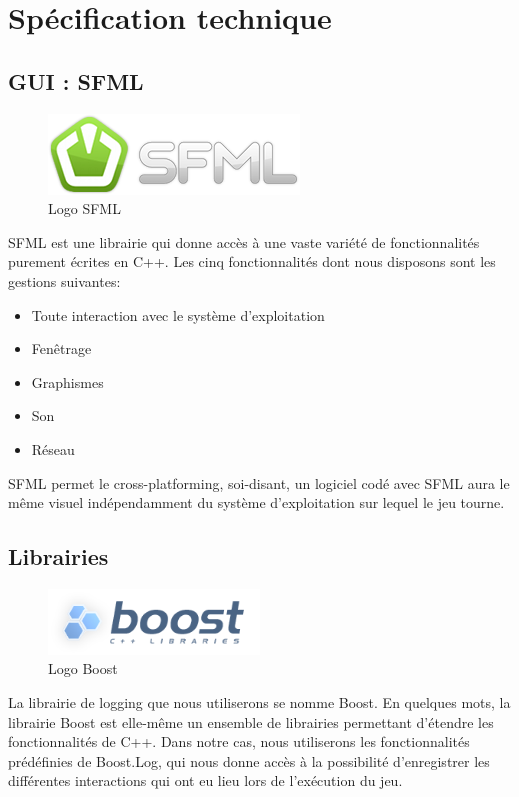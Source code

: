 \section{Spécification technique}

\subsection{GUI : SFML}
\begin{figure}[h]
	\centering
	\includegraphics{SFML_logo.png}
	\caption{Logo SFML}
	\label{fig:logo_sfml}
\end{figure}
SFML est une librairie qui donne accès à une vaste variété de fonctionnalités purement écrites en C++. Les cinq fonctionnalités dont nous disposons sont les gestions suivantes:
\begin{itemize}
	\item Toute interaction avec le système d'exploitation
	\item Fenêtrage
	\item Graphismes
	\item Son
	\item Réseau
\end{itemize}

SFML permet le cross-platforming, soi-disant, un logiciel codé avec SFML aura le même visuel indépendamment du système d'exploitation sur lequel le jeu tourne.

\subsection{Librairies}
\begin{figure}[h]
	\centering
	\includegraphics[width=0.5\textwidth]{Boost_logo.png}
	\caption{Logo Boost}
	\label{fig:logo_boost}
\end{figure}
La librairie de logging que nous utiliserons se nomme Boost. En quelques mots, la librairie Boost est elle-même un ensemble de librairies permettant d'étendre les fonctionnalités de C++. Dans notre cas, nous utiliserons les fonctionnalités prédéfinies de Boost.Log, qui nous donne accès à la possibilité d'enregistrer les différentes interactions qui ont eu lieu lors de l'exécution du jeu.


